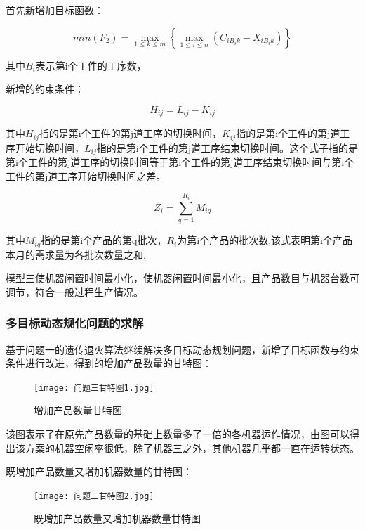 \documentclass{whutmod}
\begin{document}
\begin{spacing}{1.2}
     首先新增加目标函数：

     \begin{equation}
      min\left ( F_{2}  \right ) = \max_{1\le k\le m}\left \{ \max_{1\le i\le n}\left ( C_{iB_{i}k}- X_{iB_{i}k} \right )   \right \}  
    \end{equation}

    其中$B_i$表示第i个工件的工序数， 

    新增的约束条件：

     \begin{equation}
     H_{ij} =L_{ij} -K_{ij} 
    \end{equation}

    
其中$H_{ij}$指的是第i个工件的第j道工序的切换时间，$K_{ij}$指的是第i个工件的第j道工序开始切换时间，$L_{ij}$指的是第i个工件的第j道工序结束切换时间。这个式子指的是第i个工件的第j道工序的切换时间等于第i个工件的第j道工序结束切换时间与第i个工件的第j道工序开始切换时间之差。

 \begin{equation}
     Z_{i} = \sum_{q=1}^{R_{i} }M_{iq}
    \end{equation}

其中$M_{iq}$指的是第i个产品的第q批次，$R_i$为第i个产品的批次数,该式表明第i个产品本月的需求量为各批次数量之和.

  模型三使机器闲置时间最小化，使机器闲置时间最小化，且产品数目与机器台数可调节，符合一般过程生产情况。

 \subsubsection{多目标动态规化问题的求解}

     基于问题一的遗传退火算法继续解决多目标动态规划问题，新增了目标函数与约束条件进行改进，得到的增加产品数量的甘特图：
     
     \begin{figure}[H]
        \centering
        \texttt{[image: 问题三甘特图1.jpg]}
        \caption{增加产品数量甘特图}
    \end{figure}

     该图表示了在原先产品数量的基础上数量多了一倍的各机器运作情况，由图可以得出该方案的机器空闲率很低，除了机器三之外，其他机器几乎都一直在运转状态。
     
     
     
     既增加产品数量又增加机器数量的甘特图：

  \begin{figure}[H]
        \centering
        \texttt{[image: 问题三甘特图2.jpg]}
        \caption{既增加产品数量又增加机器数量甘特图}
    \end{figure}


\end{spacing}
\end{document}
